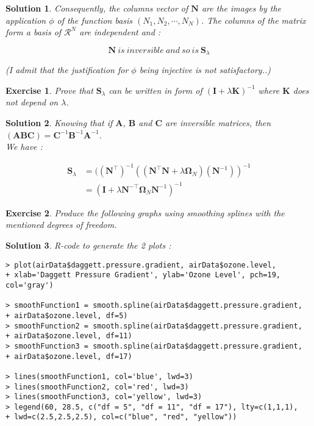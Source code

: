 \documentclass[12pt,a4paper]{article}
\def\R{\mathcal{R}}%
\newtheorem{exercise}{Exercise}
\newtheorem{solution}{Solution}
\begin{document}
\begin{solution}
Consequently, the columns vector of $\boldsymbol N$ are the images by the application $\phi$ of the function basis $(N_1, N_2, \cdots, N_N)$. The columns of the matrix form a basis of $\R^N$ are independent and :  

$$\boxed{\boldsymbol N \ is\ inversible\ and\ so\ is\ \boldsymbol S_\lambda}$$

(I admit that the justification for $\phi$ being injective is not satisfactory..)          
\end{solution}

\begin{exercise}
Prove that $\boldsymbol S_\lambda$ can be written in form of $(\boldsymbol I + \lambda \boldsymbol K)^{-1}$ where $ \boldsymbol K$ does not depend on $\lambda$.
\end{exercise}
\begin{solution}
Knowing that if $\boldsymbol A$, $\boldsymbol B$ and $\boldsymbol C$ are inversible matrices, then $(\boldsymbol A \boldsymbol B \boldsymbol C) =  \boldsymbol C^{-1} \boldsymbol B^{-1} \boldsymbol A^{-1}$. \\

We have : 

\begin{equation}
\boxed{\begin{split}
\boldsymbol S_\lambda & = ((\boldsymbol N^\top)^{-1}((\boldsymbol N^\top \boldsymbol N + \lambda \boldsymbol \Omega_N)(\boldsymbol N^{-1}))^{-1} \\
& = (\boldsymbol I + \lambda \boldsymbol N^{-\top} \boldsymbol \Omega_N \boldsymbol N^{-1})^{-1}
\end{split}}
\end{equation}
\end{solution}

\begin{exercise}
Produce the following graphs using smoothing splines with the mentioned degrees of freedom. 
\end{exercise}
\begin{solution}
R-code to generate the 2 plots : \\

\begin{verbatim}
> plot(airData$daggett.pressure.gradient, airData$ozone.level, 
+ xlab='Daggett Pressure Gradient', ylab='Ozone Level', pch=19, col='gray')

> smoothFunction1 = smooth.spline(airData$daggett.pressure.gradient,
+ airData$ozone.level, df=5)
> smoothFunction2 = smooth.spline(airData$daggett.pressure.gradient, 
+ airData$ozone.level, df=11)
> smoothFunction3 = smooth.spline(airData$daggett.pressure.gradient,
+ airData$ozone.level, df=17)

> lines(smoothFunction1, col='blue', lwd=3)
> lines(smoothFunction2, col='red', lwd=3)
> lines(smoothFunction3, col='yellow', lwd=3)
> legend(60, 28.5, c("df = 5", "df = 11", "df = 17"), lty=c(1,1,1),
+ lwd=c(2.5,2.5,2.5), col=c("blue", "red", "yellow"))
\end{verbatim}
\end{solution}
\end{document}

